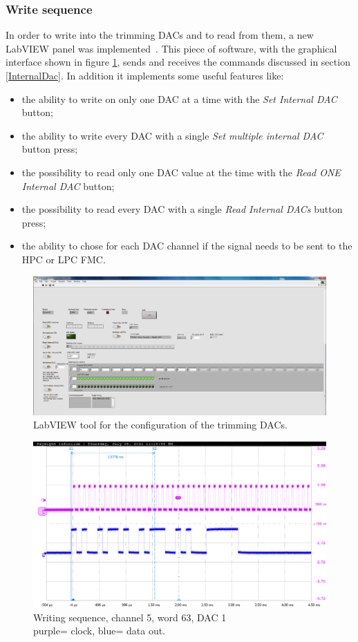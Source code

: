 \subsubsection{Write sequence}
\noindent In order to write into the trimming DACs and to read from them, a new LabVIEW panel was implemented~\cite{data}. This piece of software, with the graphical interface shown in figure \ref{fig:labview3}, sends and receives the commands discussed in section \ref{InternalDac}. In addition it implements some useful features like:
\begin{itemize}
	\item the ability to write on only one DAC at a time with the \textit{Set Internal DAC} button;
	\item the ability to write every DAC with a single \textit{Set multiple internal DAC} button press;
	\item the possibility to read only one DAC value at the time with the \textit{Read ONE Internal DAC} button;
	\item the possibility to read every DAC with a single \textit{Read Internal DACs} button press;
	\item the ability to chose for each DAC channel if the signal needs to be sent to the HPC or LPC FMC.
\end{itemize}
\begin{figure}[H]
	\centering
	\includegraphics[width=0.99\linewidth]{IMG/ch3/LABVIEW2}
	\caption{LabVIEW tool for the configuration of the trimming DACs.}
	\label{fig:labview3}
\end{figure}
\begin{figure}[H]
	\centering
	\includegraphics[width=0.7\linewidth]{IMG/ch5/probe/09-08-2021_ch05-write63-baselinedac1}
	\caption{Writing sequence, channel 5, word 63, DAC 1\\{\color{magenta}purple}= clock, {\color{blue}blue}= data out.}
	\label{fig:ch05write63}
\end{figure}
